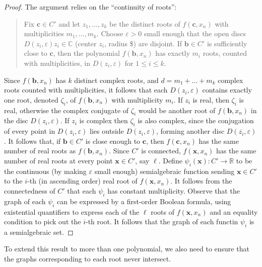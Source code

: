\documentclass[
]{book}
\theoremstyle{definition}
\theoremstyle{definition}
\theoremstyle{definition}
\theoremstyle{definition}
\theoremstyle{remark}
\begin{document}
\begin{proof}
The argument relies on the ``continuity of roots'':

\begin{quote}
Fix \(\mathbf{c} \in C'\) and let \(z_1,\ldots,z_k\) be the distinct roots of \(f(\mathbf{c},x_n)\) with multiplicities \(m_1,\ldots,m_k\).
Choose \(\varepsilon > 0\) small enough that the open discs \(D(z_i,\varepsilon) z_i \in \mathbb{C}\) (center \(z_i\), radius \$\varepsilon) are disjoint. If \(\mathbf{b} \in C'\) is sufficiently close to \(\mathbf{c}\), then the polynomial \(f(\mathbf{b}, x_n)\) has exactly \(m_i\) roots, counted with multiplicities, in \(D(z_i,\varepsilon)\) for \(1\le i \le k\).
\end{quote}

Since \(f(\mathbf{b},x_n)\) has \(k\) distinct complex roots, and \(d = m_1+ \ldots + m_k\) complex roots counted with multiplicities, it follows that each \(D(z_i,\varepsilon)\) contains exactly one root, denoted \(\zeta_i\), of \(f(\mathbf{b},x_n)\) with multiplicity \(m_i\).
If \(z_i\) is real, then \(\zeta_i\) is real, otherwise the complex conjugate of \(\zeta_i\) would be another root of \(f(\mathbf{b},x_n)\) in the disc \(D(z_i,\varepsilon)\).
If \(z_i\) is complex then \(\zeta_i\) is also complex, since the conjugation of every point in \(D(z_i, \varepsilon)\) lies outside \(D(z_i, \varepsilon)\), forming another disc \(D(\overline{z_i}, \varepsilon)\).
It follows that, if \(\mathbf{b} \in C'\) is close enough to \(\mathbf{c}\), then \(f(\mathbf{c},x_n)\) has the same number of real roots as \(f(\mathbf{b},x_n)\). Since \(C'\) is connected, \(f(\mathbf{x},x_n)\) has the same number of real roots at every point \(\mathbf{x} \in C'\), say \(\ell\).
Define \(\psi_i(\mathbf{x}) : C' \to \mathbb{R}\) to be the continuous (by making \(\varepsilon\) small enough) semialgebraic function sending \(\mathbf{x} \in C'\) to the \(i\)-th (in ascending order) real root of \(f(\mathbf{x},x_n)\). It follows from the connectedness of \(C'\) that each \(\psi_i\) has constant multiplicity.
Observe that the graph of each \(\psi_i\) can be expressed by a first-order Boolean formula, using existential quantifiers to express each of the \(\ell\) roots of \(f(\mathbf{x},x_n)\) and an equality condition to pick out the \(i\)-th root.
It follows that the graph of each functin \(\psi_i\) is a semialgebraic set.
\end{proof}

To extend this result to more than one polynomial, we also need to ensure that the graphs corresponding to each root never intersect.
\end{document}

